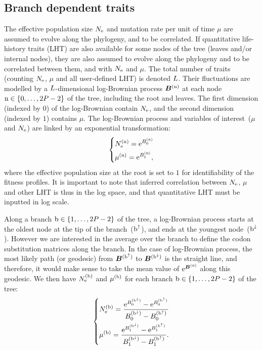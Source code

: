 \subsection{Branch dependent traits}
The effective population size $N_{\text{e}}$ and mutation rate per unit of time $\mu$ are assumed to evolve along the phylogeny, and to be correlated.
If quantitative life-history traits (\acrshort{LHT}) are also available for some nodes of the tree (leaves and/or internal nodes), they are also assumed to evolve along the phylogeny and to be correlated between them, and with $N_{\text{e}}$ and $\mu$.
The total number of traits (counting $N_{\text{e}}$, $\mu$ and all user-defined LHT) is denoted $L$.
Their fluctuations are modelled by a $L$-dimensional log-Brownian process $\bm{B}^{(\text{n})}$ at each node $\text{n} \in \{0, \hdots, 2 P - 2\}$ of the tree, including the root and leaves.
The first dimension (indexed by $0$) of the log-Brownian contain $N_{\text{e}}$, and the second dimension (indexed by $1$) contains $\mu$.
The log-Brownian process and variables of interest~($\mu$ and $N_{\text{e}}$) are linked by an exponential transformation:
\begin{equation}
    \begin{dcases}
        N_{\text{e}}^{(\text{n})} = \text{e}^{ B_{0}^{(\text{n})} } \\
        \mu^{(\text{n})} = \text{e}^{ B_{1}^{(\text{n})} },
    \end{dcases}
\end{equation}
where the effective population size at the root is set to $1$ for identifiability of the fitness profiles.
It is important to note that inferred correlation between $N_{\text{e}}$, $\mu$ and other \acrshort{LHT} is thus in the log space, and that quantitative \acrshort{LHT} must be inputted in log scale.

Along a branch $\text{b} \in \{1, \hdots, 2 P - 2\}$ of the tree, a log-Brownian process starts at the oldest node at the tip of the branch~($\text{b}^{\uparrow}$), and ends at the youngest node~($\text{b}^{\downarrow}$).
However we are interested in the average over the branch to define the codon substitution matrices along the branch.
In the case of log-Brownian process, the most likely path (or geodesic) from $\bm{B}^{(\text{b}^{\uparrow})}$ to $\bm{B}^{(\text{b}^{\downarrow})}$ is the straight line, and therefore, it would make sense to take the mean value of $\text{e}^{\bm{B}^{(\text{n})}}$ along this geodesic.
We then have $N_{\text{e}}^{(\text{b})}$ and $\mu^{(\text{b})}$ for each branch $\text{b} \in \{1, \hdots, 2 P - 2\}$ of the tree:
\begin{equation}
    \label{eq:branchNemu}
    \begin{dcases}
        \Ne\branchexp = \dfrac{\e^{\brownian_{0}^{(\nodeDown)}} - \e^{\brownian_{0}^{(\nodeUp)}}}{\brownian_{0}^{(\nodeDown)} - \brownian_{0}^{(\nodeUp)}} \\
        \mu\branchexp = \dfrac{\e^{\brownian_{1}^{(\nodeDown)}} - \e^{\brownian_{1}^{(\nodeUp)}}}{\brownian_{1}^{(\nodeDown)} - \brownian_{1}^{(\nodeUp)}}.
    \end{dcases}
\end{equation}

